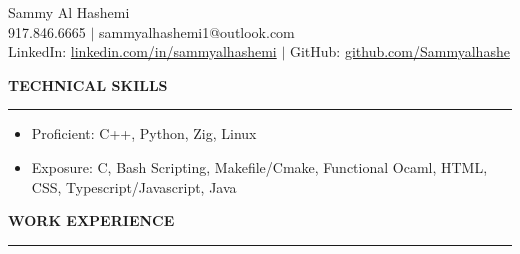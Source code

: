 \documentclass[12pt]{article}
\newcommand{\sectionRule}{\textcolor{gray}{\rule{7.27in}{0.02cm}}}
\newcommand{\sectionTxt}[1]{\noindent\textbf{#1}\\}
\begin{document}
    \begin{center}
        {\huge Sammy Al Hashemi}\\
        {\normalsize 917.846.6665 $|$ sammyalhashemi1@outlook.com}\\
        {\normalsize LinkedIn: \href{https://www.linkedin.com/in/sammyalhashemi}{linkedin.com/in/sammyalhashemi} $|$ GitHub: \href{https://github.com/Sammyalhashe}{github.com/Sammyalhashe}}\\
    \end{center}
    \sectionTxt{TECHNICAL SKILLS}
    \sectionRule
    \begin{small}
        \begin{itemize}
            \itemsep0em 
            \item Proficient: {\color{textGray}C++, Python, Zig, Linux}
            \item Exposure: {\color{textGray}C, Bash Scripting, Makefile/Cmake, Functional Ocaml, HTML, CSS, Typescript/Javascript, Java}
        \end{itemize}
    \end{small}
    \sectionTxt{WORK EXPERIENCE}
    \sectionRule
\end{document}
